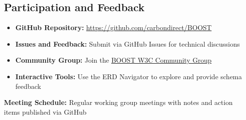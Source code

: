 \subsection{Participation and Feedback}
\label{sec:participation}

\begin{informative}[title=How to Contribute]
\begin{itemize}
    \item \textbf{GitHub Repository:} \url{https://github.com/carbondirect/BOOST}
    \item \textbf{Issues and Feedback:} Submit via GitHub Issues for technical discussions
    \item \textbf{Community Group:} Join the \href{https://www.w3.org/community/boost-01/}{BOOST W3C Community Group}
    \item \textbf{Interactive Tools:} Use the ERD Navigator to explore and provide schema feedback
\end{itemize}

\textbf{Meeting Schedule:} Regular working group meetings with notes and action items published via GitHub
\end{informative}